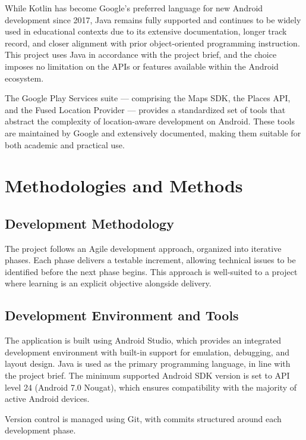 \documentclass[12pt, a4paper]{article}
\begin{document}
While Kotlin has become Google's preferred language for new Android development since 2017, Java remains fully supported and continues to be widely used in educational contexts due to its extensive documentation, longer track record, and closer alignment with prior object-oriented programming instruction. This project uses Java in accordance with the project brief, and the choice imposes no limitation on the APIs or features available within the Android ecosystem.

The Google Play Services suite — comprising the Maps SDK, the Places API, and the Fused Location Provider — provides a standardized set of tools that abstract the complexity of location-aware development on Android. These tools are maintained by Google and extensively documented, making them suitable for both academic and practical use.

\section{Methodologies and Methods}

\subsection{Development Methodology}

The project follows an Agile development approach, organized into iterative phases. Each phase delivers a testable increment, allowing technical issues to be identified before the next phase begins. This approach is well-suited to a project where learning is an explicit objective alongside delivery.

\subsection{Development Environment and Tools}

The application is built using Android Studio, which provides an integrated development environment with built-in support for emulation, debugging, and layout design. Java is used as the primary programming language, in line with the project brief. The minimum supported Android SDK version is set to API level 24 (Android 7.0 Nougat), which ensures compatibility with the majority of active Android devices.

Version control is managed using Git, with commits structured around each development phase.
\end{document}
